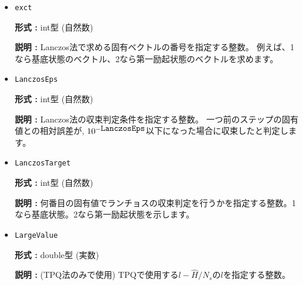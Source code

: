 \begin{itemize}
{\bf 形式 :} int型 (整数)

{\bf 説明 :} 
 {初期条件のベクトルを与えます。}
\begin{itemize}
\item{ランチョス法}
\begin{itemize}
\item{カノニカル集団かつ \verb|initial_iv| $\geq 0$の場合}

ノンゼロの成分が指定されます。

\item{ \verb|initial_iv| $< 0$の場合}

乱数のシードが指定され、全ての成分に対して係数がランダムに与えられます。なお、グランドカノニカルの場合は初期状態として多くの状態を持つよう、こちらの様式が適用されます。
\end{itemize}

\item{TPQ法}

乱数のシードが指定され、全ての成分に対して係数がランダムに与えられます。
\end{itemize}
初期ベクトル設定の詳細については、\ref{Ch:algorithm}を参照ください。
 
 \item  \verb|exct|

{\bf 形式 :} int型 (自然数)

{\bf 説明 :} Lanczos法で求める固有ベクトルの番号を指定する整数。
例えば、1なら基底状態のベクトル、2なら第一励起状態のベクトルを求めます。

\item   \verb|LanczosEps|
   
{\bf 形式 :} int型 (自然数)

{\bf 説明 :} Lanczos法の収束判定条件を指定する整数。
一つ前のステップの固有値との相対誤差が, $10^{- \verb|LanczosEps|}$以下になった場合に収束したと判定します。

 \item  \verb|LanczosTarget| 
   
 {\bf 形式 :} int型 (自然数)

  {\bf 説明 :} 何番目の固有値でランチョスの収束判定を行うかを指定する整数。1なら基底状態。2なら第一励起状態を示します。
     
\item \verb|LargeValue|

{\bf 形式 :} double型 (実数)

{\bf 説明 :} (TPQ法のみで使用) TPQで使用する$l-\hat{H}/N_{s}$の$l$を指定する整数。
 

\end{itemize}

